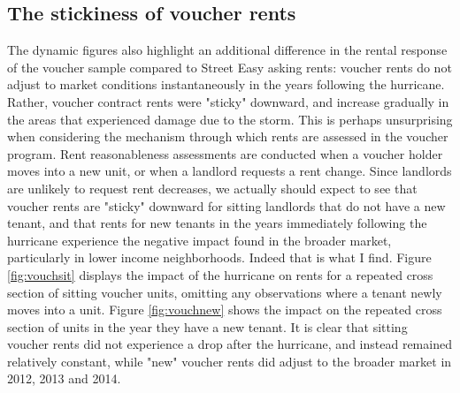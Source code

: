 \documentclass[12pt]{article}
\begin{document}
{{{{{\subsection{The stickiness of voucher rents}

The dynamic figures also highlight an additional difference in the rental response of the voucher sample compared to Street Easy asking rents: voucher rents do not adjust to market conditions instantaneously in the years following the hurricane. Rather, voucher contract rents were "sticky" downward, and increase gradually in the areas that experienced damage due to the storm.  This is perhaps unsurprising when considering the mechanism through which rents are assessed in the voucher program.  Rent reasonableness assessments are conducted when a voucher holder moves into a new unit, or when a landlord requests a rent change.  Since landlords are unlikely to request rent decreases, we actually should expect to see that voucher rents are "sticky" downward for sitting landlords that do not have a new tenant, and that rents for new tenants in the years immediately following the hurricane experience the negative impact found in the broader market, particularly in lower income neighborhoods.  Indeed that is what I find.  Figure \ref{fig:vouchsit} displays the impact of the hurricane on rents for a repeated cross section of sitting voucher units, omitting any observations where a tenant newly moves into a unit.  Figure \ref{fig:vouchnew} shows the impact on the repeated cross section of units in the year they have a new tenant.  It is clear that sitting voucher rents did not experience a drop after the hurricane, and instead remained relatively constant, while "new" voucher rents did adjust to the broader market in 2012, 2013 and 2014.



}}}}}
\end{document}
